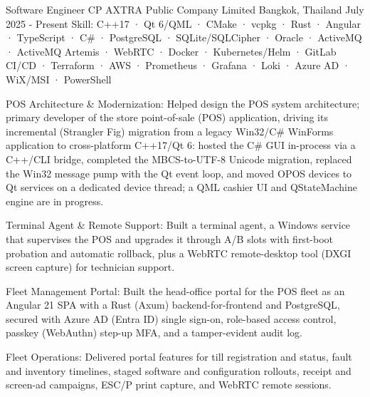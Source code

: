 
\begin{cventries}

  \cventry
    {Software Engineer} %
    {CP AXTRA Public Company Limited} %
    {Bangkok, Thailand} %
    {July 2025 - Present} %
    {Skill: C++17 · Qt 6/QML · CMake · vcpkg · Rust · Angular · TypeScript · C\# · PostgreSQL · SQLite/SQLCipher · Oracle · ActiveMQ · ActiveMQ Artemis · WebRTC · Docker · Kubernetes/Helm · GitLab CI/CD · Terraform · AWS · Prometheus · Grafana · Loki · Azure AD · WiX/MSI · PowerShell} %
    {
      \begin{cvitems} %
      \item {POS Architecture \& Modernization: Helped design the POS system architecture; primary developer of the store point-of-sale (POS) application, driving its incremental (Strangler Fig) migration from a legacy Win32/C\# WinForms application to cross-platform C++17/Qt 6: hosted the C\# GUI in-process via a C++/CLI bridge, completed the MBCS-to-UTF-8 Unicode migration, replaced the Win32 message pump with the Qt event loop, and moved OPOS devices to Qt services on a dedicated device thread; a QML cashier UI and QStateMachine engine are in progress.}
      \item {Terminal Agent \& Remote Support: Built a terminal agent, a Windows service that supervises the POS and upgrades it through A/B slots with first-boot probation and automatic rollback, plus a WebRTC remote-desktop tool (DXGI screen capture) for technician support.}
      \item {Fleet Management Portal: Built the head-office portal for the POS fleet as an Angular 21 SPA with a Rust (Axum) backend-for-frontend and PostgreSQL, secured with Azure AD (Entra ID) single sign-on, role-based access control, passkey (WebAuthn) step-up MFA, and a tamper-evident audit log.}
      \item {Fleet Operations: Delivered portal features for till registration and status, fault and inventory timelines, staged software and configuration rollouts, receipt and screen-ad campaigns, ESC/P print capture, and WebRTC remote sessions.}

\end{cvitems}}
\end{cventries}
